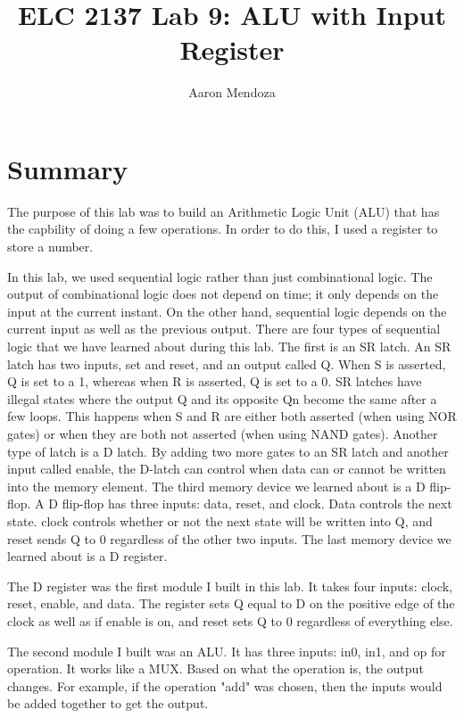 \documentclass[11pt]{article}
\begin{document}
\title{ELC 2137 Lab 9: ALU with Input Register}
\author{Aaron Mendoza}

\maketitle


\section*{Summary}

The purpose of this lab was to build an Arithmetic Logic Unit (ALU) that has the capbility of doing a few operations. In order to do this, I used a register to store a number.

In this lab, we used sequential logic rather than just combinational logic. The output of combinational logic does not depend on time; it only depends on the input at the current instant. On the other hand, sequential logic depends on the current input as well as the previous output. There are four types of sequential logic that we have learned about during this lab. The first is an SR latch. An SR latch has two inputs, set and reset, and an output called Q. When S is asserted, Q is set to a 1, whereas when R is asserted, Q is set to a 0. SR latches have illegal states where the output Q and its opposite Qn become the same after a few loops. This happens when S and R are either both asserted (when using NOR gates) or when they are both not asserted (when using NAND gates). Another type of latch is a D latch. By adding two more gates to an SR latch and another input called enable, the D-latch can control when data can or cannot be written into the memory element. The third memory device we learned about is a D flip-flop. A D flip-flop has three inputs: data, reset, and clock. Data controls the next state. clock controls whether or not the next state will be written into Q, and reset sends Q to 0 regardless of the other two inputs. The last memory device we learned about is a D register.

The D register was the first module I built in this lab. It takes four inputs: clock, reset, enable, and data. The register sets Q equal to D on the positive edge of the clock as well as if enable is on, and reset sets Q to 0 regardless of everything else.

The second module I built was an ALU. It has three inputs: in0, in1, and op for operation. It works like a MUX. Based on what the operation is, the output changes. For example, if the operation "add" was chosen, then the inputs would be added together to get the output.
\end{document}
